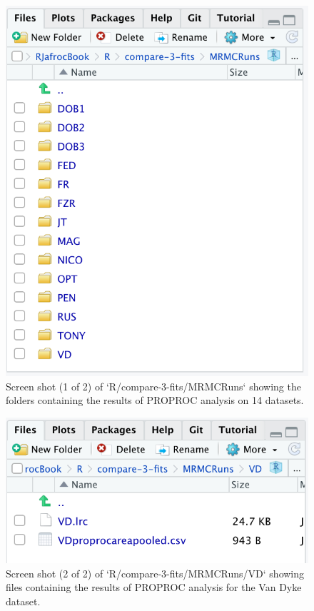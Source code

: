 \documentclass[
]{book}
\begin{document}
\begin{figure}

{\centering \includegraphics{images/compare-3-fits/MRMCRuns} 

}

\caption{Screen shot (1 of 2) of `R/compare-3-fits/MRMCRuns` showing the folders containing the results of PROPROC analysis on 14 datasets.}\label{fig:rsm-3-fits-mrmc-runs}
\end{figure}

\begin{figure}

{\centering \includegraphics{images/compare-3-fits/MRMCRuns-VD} 

}

\caption{Screen shot (2 of 2) of `R/compare-3-fits/MRMCRuns/VD` showing files containing the results of PROPROC analysis for the Van Dyke dataset.}\label{fig:rsm-3-fits-mrmc-runs-vd}
\end{figure}
\end{document}

